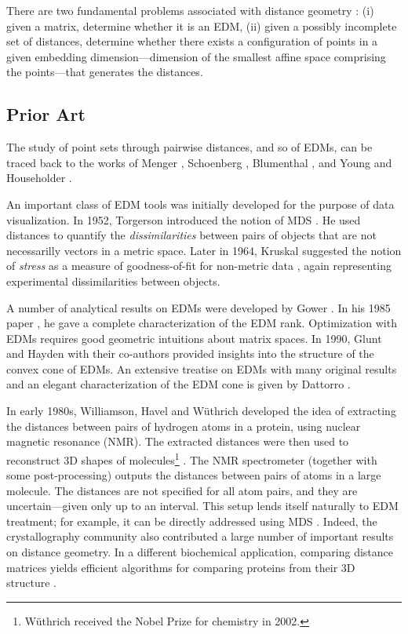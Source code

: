 \documentclass[10pt,double]{IEEEtran}
\begin{document}
There are two fundamental problems associated with distance geometry
\cite{Liberti:2012ut}: (i) given a matrix, determine whether it is an EDM,
(ii) given a possibly incomplete set of distances, determine whether there
exists a configuration of points in a given embedding dimension---dimension of the
smallest affine space comprising the points---that generates the distances.



\subsection{Prior Art}

The study of point sets through pairwise distances, and so of EDMs, can be
traced back to the works of Menger
\cite{Menger:1928bc}, Schoenberg \cite{Schoenberg:1935dk},
Blumenthal \cite{Blumenthal:1953ie}, and Young and Householder
\cite{young1938}.

An important class of EDM tools was initially developed for the purpose of
data visualization. In 1952, Torgerson introduced the notion of MDS
\cite{torgerson1952}. He used distances to quantify the
\emph{dissimilarities} between pairs of objects that are not necessarilly
vectors in a metric space. Later in 1964, Kruskal suggested the notion of
\emph{stress} as a measure of goodness-of-fit for non-metric data
\cite{kruskal1964}, again representing experimental dissimilarities between
objects. 

A number of analytical results on EDMs were developed by Gower
\cite{gower1982, gower1}. In his 1985 paper \cite{gower1}, he gave a complete
characterization of the EDM rank. Optimization with EDMs requires good
geometric intuitions about matrix spaces. In 1990, Glunt \cite{Glunt1990} and
Hayden \cite{Hayden1990} with their co-authors provided insights into the
structure of the convex cone of EDMs. An extensive treatise on EDMs with many
original results and an elegant characterization of the EDM cone is given by
Dattorro \cite{Dattorro:2011wa}.

In early 1980s, Williamson, Havel and W\"{u}thrich developed the idea of
extracting the distances between pairs of hydrogen atoms in a protein, using
nuclear magnetic resonance (NMR). The extracted distances were then used to
reconstruct 3D shapes of molecules\footnote{W\"{u}thrich received the Nobel
Prize for chemistry in 2002.} \cite{Havel1985281}. The NMR spectrometer
(together with some post-processing) outputs the distances between pairs of
atoms in a large molecule. The distances are not specified for all atom pairs,
and they are uncertain---given only up to an interval. This setup lends itself
naturally to EDM treatment; for example, it can be directly addressed using
MDS \cite{trosset1998}. Indeed, the crystallography community also contributed
a large number of important results on distance geometry. In a different
biochemical application, comparing distance matrices yields efficient
algorithms for comparing proteins from their 3D structure
\cite{Holm:1993dx}.
\end{document}

